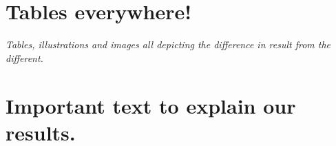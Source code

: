 \documentclass[../main.tex]{subfiles}
\begin{document}
\section{Tables everywhere!}
\textit{Tables, illustrations and images all depicting the difference in result from the different. }


\section{Important text to explain our results.}
\textit{}
\end{document}
